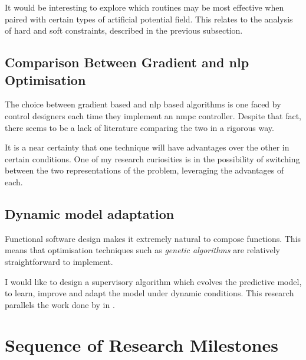 It would be interesting to explore which routines may be most effective when
paired with certain types of artificial potential field. This relates to the
analysis of hard and soft constraints, described in the previous subsection.


\subsection{Comparison Between Gradient and \acs*{nlp} Optimisation}

The choice between gradient based and \ac{nlp} based algorithms is one faced by
control designers each time they implement an \ac{nmpc} controller. Despite that
fact, there seems to be a lack of literature comparing the two in a rigorous
way.

It is a near certainty that one technique will have advantages over the other in
certain conditions. One of my research curiosities is in the possibility of
switching between the two representations of the problem, leveraging the
advantages of each.


\subsection{Dynamic model adaptation}

Functional software design makes it extremely natural to compose functions. This
means that optimisation techniques such as \emph{genetic algorithms} are
relatively straightforward to implement.

I would like to design a supervisory algorithm which evolves the predictive
model, to learn, improve and adapt the model under dynamic conditions. This
research parallels the work done by \citeauthor{Bongard2006} in
\cite{Bongard2006}.



\section{Sequence of Research Milestones}


